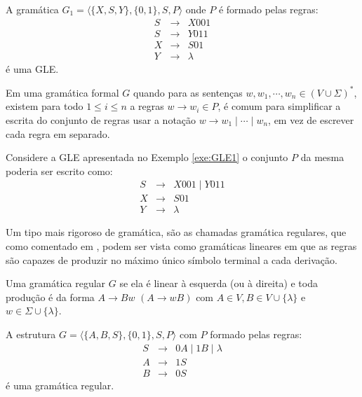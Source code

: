 \begin{exemplo}\label{exe:GLE1}
	A gramática $G_1 = \langle \{X, S , Y\}, \{0, 1\}, S, P \rangle$ onde $P$ é formado pelas regras:
	\begin{eqnarray*}
		S & \rightarrow& X001\\
		S & \rightarrow& Y011\\
		X & \rightarrow& S01\\
		Y & \rightarrow& \lambda
	\end{eqnarray*}
	é uma GLE.
\end{exemplo}

Em uma gramática formal $G$ quando para as sentenças $w, w_1, \cdots, w_n \in (V \cup \Sigma)^*$, existem para todo $1 \leq i \leq n$ a regras $w \rightarrow w_i \in P$, é comum para simplificar a escrita do conjunto de regras usar a notação $w \rightarrow w_1 \mid \cdots \mid w_n$, em vez de escrever cada regra em separado. 

\begin{exemplo}\label{exe:GLE}
	Considere a GLE apresentada no Exemplo \ref{exe:GLE1} o conjunto $P$ da mesma poderia ser escrito como:
	\begin{eqnarray*}
		S & \rightarrow& X001 \mid Y011\\
		X & \rightarrow& S01\\
		Y & \rightarrow& \lambda
	\end{eqnarray*}
\end{exemplo}


Um tipo mais rigoroso de gramática, são as chamadas gramática regulares, que como comentado em \cite{linz2006},  podem ser vista como gramáticas lineares em que as regras são capazes de produzir no máximo único símbolo terminal a cada derivação.

\begin{definicao}
	Uma gramática regular $G$ se ela é linear à esquerda (ou à direita) e toda produção é da forma $A \rightarrow Bw$ $(A \rightarrow wB)$ com $A \in V, B \in V \cup \{\lambda\}$ e $w \in \Sigma \cup \{\lambda\}$.
\end{definicao}

\begin{exemplo}\label{exe:Regular1}
  A estrutura $G = \langle \{A, B, S\}, \{0, 1\}, S, P \rangle$ com $P$ formado pelas regras:
  \begin{eqnarray*}
		S & \rightarrow& 0A \mid 1B \mid \lambda \\
		A & \rightarrow& 1S\\
		B & \rightarrow& 0S
	\end{eqnarray*}
  é uma gramática regular.
\end{exemplo}

